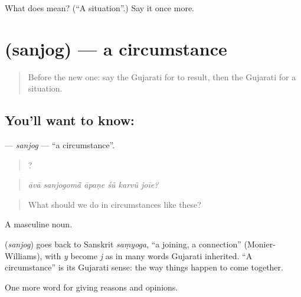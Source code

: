 \begin{tcolorbox}[breakable,colback=teal!4,colframe=teal!35!black,title={Before you move on}]
What does  mean? (\textquotedblleft{}A situation\textquotedblright{}.) Say it once more.
\end{tcolorbox}
\section[\texorpdfstring{\gu{સંજોગ} (sanjog)}{સંજોગ (sanjog)}]{ (sanjog) — a circumstance}

\label{lesson:GU-C339-sanjog}



\begin{quote}
Before the new one: say the Gujarati for to result, then the Gujarati for a situation.
\end{quote}

\subsection*{You'll want to know: }
\textbf{} — \emph{sanjog} — \textquotedblleft{}a circumstance\textquotedblright{}.

\begin{quote}
     ?
\end{quote}

\begin{quote}
\emph{āvā sanjogomā̃ āpaṇe śũ karvũ joīe?}
\end{quote}

\begin{quote}
What should we do in circumstances like these?
\end{quote}

A masculine noun.

\begin{cousinweb}
\textbf{} (\emph{sanjog}) goes back to Sanskrit \emph{saṃyoga}, \textquotedblleft{}a joining, a connection\textquotedblright{} (Monier-Williams), with \emph{y} become \emph{j} as in many words Gujarati inherited. \textquotedblleft{}A circumstance\textquotedblright{} is its Gujarati sense: the way things happen to come together.
\end{cousinweb}

\begin{grammarlens}[title={What you've built}]
One more word for giving reasons and opinions.
\end{grammarlens}

